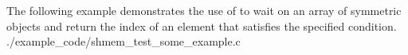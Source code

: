 \begin{apidefinition}


\begin{apiexamples}
  \apicexample
      {The following example demonstrates the use of  to
        wait on an array of symmetric objects and return the index of an
        element that satisfies the specified condition.}
      {./example_code/shmem_test_some_example.c}
      {}
\end{apiexamples}

\end{apidefinition}
